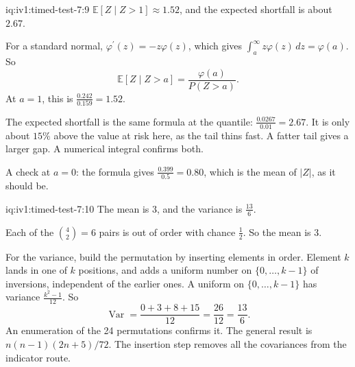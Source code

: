 \begin{solution}{iq:iv1:timed-test-7:9}
$\mathbb{E}[Z \mid Z > 1] \approx 1.52$, and the expected shortfall is about $2.67$.

For a standard normal, $\varphi^\prime(z) = -z\varphi(z)$, which gives $\int_a^\infty z\varphi(z)\,dz = \varphi(a)$. So
\[
\mathbb{E}[Z \mid Z > a] = \frac{\varphi(a)}{P(Z > a)}.
\]
At $a = 1$, this is $\frac{0.242}{0.159} = 1.52$.

The expected shortfall is the same formula at the quantile: $\frac{0.0267}{0.01} = 2.67$. It is only about $15\%$ above the value at risk here, as the tail thins fast. A fatter tail gives a larger gap. A numerical integral confirms both.

A check at $a = 0$: the formula gives $\frac{0.399}{0.5} = 0.80$, which is the mean of $|Z|$, as it should be.

\end{solution}

\begin{solution}{iq:iv1:timed-test-7:10}
The mean is 3, and the variance is $\frac{13}{6}$.

Each of the $\binom42 = 6$ pairs is out of order with chance $\frac12$. So the mean is 3.

For the variance, build the permutation by inserting elements in order. Element $k$ lands in one of $k$ positions, and adds a uniform number on $\{0, \dots, k - 1\}$ of inversions, independent of the earlier ones. A uniform on $\{0, \dots, k - 1\}$ has variance $\frac{k^2 - 1}{12}$. So
\[
\operatorname{Var} = \frac{0 + 3 + 8 + 15}{12} = \frac{26}{12} = \frac{13}{6}.
\]
An enumeration of the 24 permutations confirms it. The general result is $n(n - 1)(2n + 5)/72$. The insertion step removes all the covariances from the indicator route.

\end{solution}


